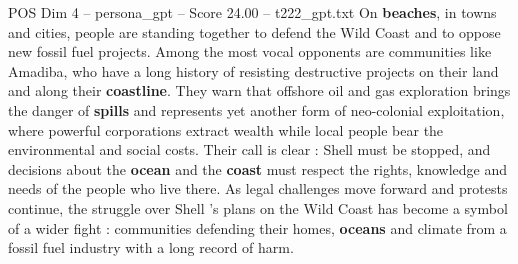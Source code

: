 \begin{textsample}{POS Dim 4 – persona\_gpt – Score 24.00 – t222\_gpt.txt}
On \textbf{beaches}, in towns and cities, people are standing together to defend the Wild Coast and to oppose new fossil fuel projects.
Among the most vocal opponents are communities like Amadiba, who have a long history of resisting destructive projects on their land and along their \textbf{coastline}.
They warn that offshore oil and gas exploration brings the danger of \textbf{spills} and represents yet another form of neo-colonial exploitation, where powerful corporations extract wealth while local people bear the environmental and social costs.
Their call is clear : Shell must be stopped, and decisions about the \textbf{ocean} and the \textbf{coast} must respect the rights, knowledge and needs of the people who live there.
As legal challenges move forward and protests continue, the struggle over Shell ’s plans on the Wild Coast has become a symbol of a wider fight : communities defending their homes, \textbf{oceans} and climate from a fossil fuel industry with a long record of harm.

\end{textsample}

